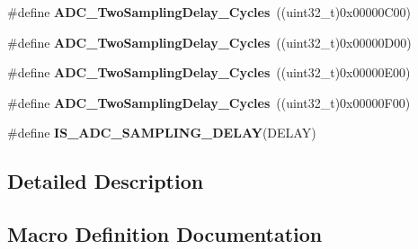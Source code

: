 \begin{DoxyCompactItemize}
\item 
\#define {\bfseries A\+D\+C\+\_\+\+Two\+Sampling\+Delay\+\_\+Cycles}~((uint32\+\_\+t)0x00000\+C00)\hypertarget{group___a_d_c__delay__between__2__sampling__phases_gaea74e18e420d600ea8a4c526f817f94d}{}\label{group___a_d_c__delay__between__2__sampling__phases_gaea74e18e420d600ea8a4c526f817f94d}

\item 
\#define {\bfseries A\+D\+C\+\_\+\+Two\+Sampling\+Delay\+\_\+Cycles}~((uint32\+\_\+t)0x00000\+D00)\hypertarget{group___a_d_c__delay__between__2__sampling__phases_gafeb801458d51f19e77ca6427126b4f35}{}\label{group___a_d_c__delay__between__2__sampling__phases_gafeb801458d51f19e77ca6427126b4f35}

\item 
\#define {\bfseries A\+D\+C\+\_\+\+Two\+Sampling\+Delay\+\_\+Cycles}~((uint32\+\_\+t)0x00000\+E00)\hypertarget{group___a_d_c__delay__between__2__sampling__phases_ga4a061cfb253b78537a899d7c49d5fb16}{}\label{group___a_d_c__delay__between__2__sampling__phases_ga4a061cfb253b78537a899d7c49d5fb16}

\item 
\#define {\bfseries A\+D\+C\+\_\+\+Two\+Sampling\+Delay\+\_\+Cycles}~((uint32\+\_\+t)0x00000\+F00)\hypertarget{group___a_d_c__delay__between__2__sampling__phases_gaf3b87ecc73e218042a64780ca3439d26}{}\label{group___a_d_c__delay__between__2__sampling__phases_gaf3b87ecc73e218042a64780ca3439d26}

\item 
\#define {\bfseries I\+S\+\_\+\+A\+D\+C\+\_\+\+S\+A\+M\+P\+L\+I\+N\+G\+\_\+\+D\+E\+L\+AY}(D\+E\+L\+AY)
\end{DoxyCompactItemize}


\subsection{Detailed Description}


\subsection{Macro Definition Documentation}
